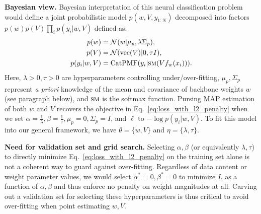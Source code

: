 \textbf{Bayesian view.} Bayesian interpretation of this neural classification problem would define a joint probabilistic model $p(w, V, y_{1:N})$ decomposed into factors $p(w)p(V) \prod_{i} p(y_i | w, V)$ defined as:
\begin{align}
    \label{eq:joint_pdf_model}
    p(w) &= \mathcal{N}( w | \mu_p, \lambda \Sigma_p), \\
    p(V) &= \mathcal{N}( \text{vec}(V) | 0, \tau I), \\
    p(y_i | w, V) &= \text{CatPMF}( y_i | \textsc{sm}( V f_w(x_i) ) ).
\end{align}
Here, $\lambda > 0, \tau > 0$ are  hyperparameters controlling under/over-fitting, $\mu_p, \Sigma_p$ represent \emph{a priori} knowledge of the mean and covariance of backbone weights $w$ (see paragraph below), and $\textsc{sm}$ is the softmax function.
Pursing MAP estimation of both $w$ and $V$ recovers the objective in Eq.~\eqref{eq:loss_with_l2_penalty} when we set
$\alpha = \frac{1}{\lambda}, \beta = \frac{1}{\tau}, \mu_p=0, \Sigma_p=I$, and $\ell$ to $- \log p(y_i | w, V)$. To fit this model into our general framework, we have $\theta = \{w, V\}$ and $\eta = \{\lambda, \tau\}$.

\textbf{Need for validation set and grid search.}
Selecting $\alpha,\beta$ (or equivalently $\lambda,\tau$) to directly minimize Eq.~\eqref{eq:loss_with_l2_penalty} on the training set alone is not a coherent way to guard against over-fitting. Regardless of data content or weight parameter values, we would select $\alpha^* = 0,\beta^* = 0$ to minimize $L$ as a function of $\alpha,\beta$ and thus enforce no penalty on weight magnitudes at all. Carving out a validation set for selecting these hyperparameters is thus critical to avoid over-fitting when point estimating $w,V$.



